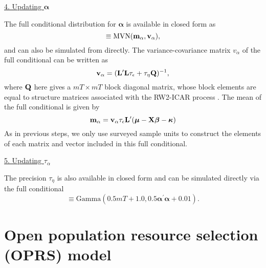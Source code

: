 \documentclass[12pt,fleqn]{article}
\begin{document}
\begin{flushleft}
\underline{4. Updating $\boldsymbol{\alpha}$}

The full conditional distribution for $\boldsymbol{\alpha}$ is available in closed form as
\begin{equation*}
  [\boldsymbol{\alpha} | \cdot] \equiv \textrm{MVN}({\bf m}_{\alpha},{\bf v}_{\alpha}),
\end{equation*}
and can also be simulated from directly.  The variance-covariance matrix $v_{\alpha}$ of the full conditional can be written as
\begin{equation*}
  {\bf v}_{\alpha} = ({\bf L}^{\prime}{\bf L} \tau_\epsilon + \tau_\eta {\bf Q})^{-1},
\end{equation*}
where ${\bf Q}$ here gives a $mT \times mT$ block diagonal matrix, whose block elements are equal to structure matrices associated with the RW2-ICAR process \citep[see][for instructions on how to construct this matrix]{RueHeld2005}.  The mean of the full conditional is given by
\begin{equation*}
  {\bf m}_{\alpha} = {\bf v}_\alpha \tau_\epsilon {\bf L}^\prime (\boldsymbol{\mu}- {\bf X} \boldsymbol{\beta} - \boldsymbol{\kappa})
\end{equation*}
As in previous steps, we only use surveyed sample units to construct the elements of each matrix and vector included in this full conditional.

\underline{5. Updating $\tau_\alpha$}

The precision $\tau_\eta$ is also available in closed form and can be simulated directly via the full conditional
\begin{equation*}
  [\tau_\eta | \cdot] \equiv \textrm{Gamma}(0.5mT + 1.0,0.5 \boldsymbol{\alpha}^\prime \boldsymbol{\alpha} + 0.01).
\end{equation*}

\section{Open population resource selection (OPRS) model}


\end{flushleft}
\end{document}
